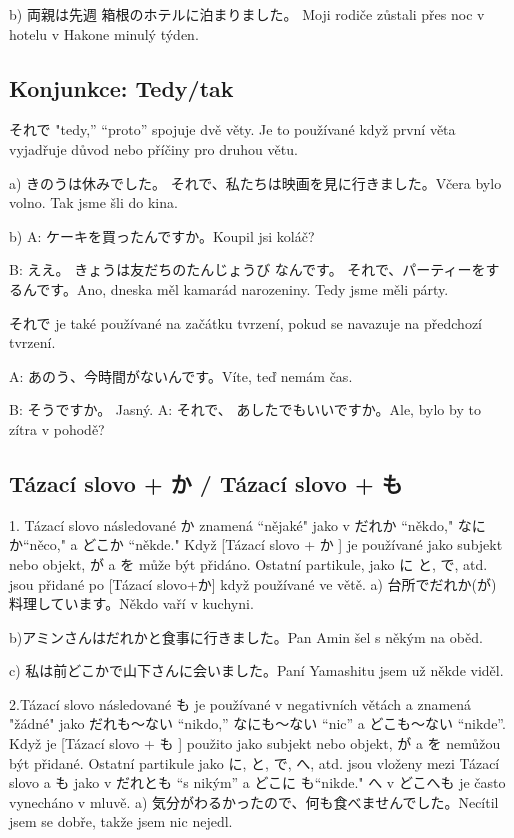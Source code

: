 b) 両親は先週 箱根のホテルに泊まりました。 Moji rodiče zůstali přes noc v hotelu v Hakone minulý týden.


\subsection{Konjunkce: Tedy/tak}
それで "tedy,” “proto” spojuje dvě věty. Je to používané když první věta vyjadřuje důvod nebo příčiny pro druhou větu.

a) きのうは休みでした。 それで、私たちは映画を見に行きました。Včera bylo volno. Tak jsme šli do kina.

b) A: ケーキを買ったんですか。Koupil jsi koláč?


B: ええ。 きょうは友だちのたんじょうび なんです。 それで、パーティーをするんです。Ano, dneska měl kamarád narozeniny. Tedy jsme měli párty.


それで je také používané na začátku tvrzení, pokud se navazuje na předchozí tvrzení.

A: あのう、今時間がないんです。Víte, teď nemám čas.

B: そうですか。 Jasný.
A: それで、 あしたでもいいですか。Ale, bylo by to zítra v pohodě?



\subsection{ Tázací slovo + か / Tázací slovo + も}
1. Tázací slovo následované  か znamená  “nějaké" jako v だれか “někdo," なにか“něco," a どこか “někde." Když  [Tázací slovo + か ] je používané jako subjekt nebo objekt, が a を může být přidáno. Ostatní partikule, jako に と, で, atd. jsou přidané po [Tázací slovo+か] když používané ve větě.
a) 台所でだれか(が) 料理しています。Někdo vaří v kuchyni.

b)アミンさんはだれかと食事に行きました。Pan Amin šel s někým na oběd.


c) 私は前どこかで山下さんに会いました。Paní Yamashitu jsem už někde viděl.


2.Tázací slovo následované も je používané v negativních větách a znamená "žádné" jako だれも〜ない “nikdo,”  なにも〜ない “nic” a どこも〜ない “nikde”. Když je [Tázací slovo + も ] použito jako subjekt nebo objekt,  が a を nemůžou být přidané. Ostatní partikule jako  に, と, で, へ, atd. jsou vloženy mezi Tázací slovo a  も jako v だれとも “s nikým” a どこに も“nikde." へ v どこへも je často vynecháno v mluvě.
a) 気分がわるかったので、何も食べませんでした。Necítil jsem se dobře, takže jsem nic nejedl.

